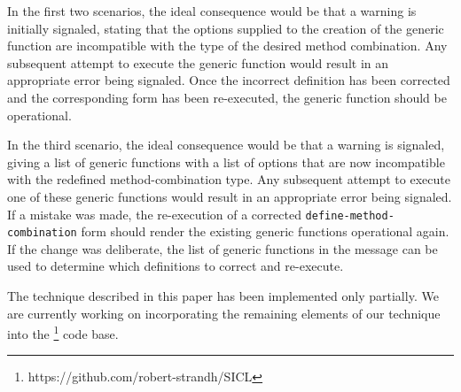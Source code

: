 In the first two scenarios, the ideal consequence would be that a
warning is initially signaled, stating that the options supplied to
the creation of the generic function are incompatible with the type of
the desired method combination.  Any subsequent attempt to execute the
generic function would result in an appropriate error being signaled.
Once the incorrect definition has been corrected and the corresponding
form has been re-executed, the generic function should be operational.

In the third scenario, the ideal consequence would be that a warning
is signaled, giving a list of generic functions with a list of options
that are now incompatible with the redefined method-combination type.
Any subsequent attempt to execute one of these generic functions would
result in an appropriate error being signaled.  If a mistake was made,
the re-execution of a corrected \texttt{define-method-combination}
form should render the existing generic functions operational again.
If the change was deliberate, the list of generic functions in the
message can be used to determine which definitions to correct and
re-execute.

The technique described in this paper has been implemented only
partially.  We are currently working on incorporating the remaining
elements of our technique into the \sicl{}%
\footnote{https://github.com/robert-strandh/SICL}
code base.
